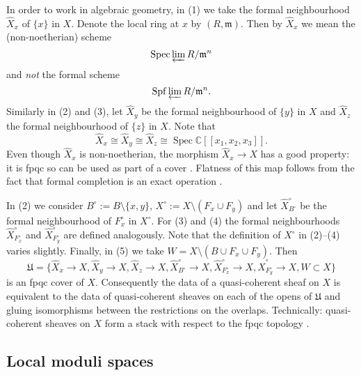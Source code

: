 \documentclass{amsart}
\theoremstyle{definition}
\newcommand{\CC} {\mathbb{C}}          %
\newcommand{\Spec}{\operatorname{Spec}}
\begin{document}
In order to work in algebraic geometry, in (1) we take the formal neighbourhood $\widehat{X}_x$ of $\{x\}$ in $X$. Denote the local ring at $x$ by $(R,\mathfrak{m})$. Then by $\widehat{X}_x$ we mean the (non-noetherian) scheme
$$
\Spec \varprojlim R / \mathfrak{m}^n 
$$
and \emph{not} the formal scheme $$\mathrm{Spf} \varprojlim R / \mathfrak{m}^n.$$ Similarly in (2) and (3), let $\widehat{X}_y$ be the formal neighbourhood of $\{y\}$ in $X$ and $\widehat{X}_z$ the formal neighbourhood of $\{z\}$ in $X$. Note that 
$$
\widehat{X}_x \cong \widehat{X}_y \cong \widehat{X}_z \cong\Spec \CC[\![x_1,x_2,x_3]\!].
$$
Even though $\widehat{X}_x$ is non-noetherian, the morphism $\widehat{X}_x \rightarrow X$ has a good property: it is fpqc so can be used as part of a cover \cite[Sect.~2.3.2]{Vis}. Flatness of this map follows from the fact that formal completion is an exact operation \cite[Prop.~10.14]{AM}. 

In (2) we consider $B^\circ := B \setminus \{x,y\}$, $X^\circ := X \setminus (F_x  \cup F_y)$ and let $\widehat{X}^{\circ}_{B^\circ}$ be the formal neighbourhood of $F_{x}^{\circ}$ in $X^\circ$. For (3) and (4) the formal neighbourhoods $\widehat{X}^{\circ}_{F_{x}^{\circ}}$ and $\widehat{X}^{\circ}_{F_{y}^{\circ}}$ are defined analogously. Note that the definition of $X^\circ$ in (2)--(4) varies slightly. Finally, in (5) we take $W = X \setminus (B \cup F_x \cup F_y)$. Then
$$
\mathfrak{U} = \{\widehat{X}_x \rightarrow X, \widehat{X}_y \rightarrow X, \widehat{X}_z \rightarrow X, \widehat{X}^{\circ}_{B^\circ} \rightarrow X, \widehat{X}^{\circ}_{F_{x}^{\circ}} \rightarrow X, \widehat{X}^{\circ}_{F_{y}^{\circ}} \rightarrow X, W \subset X\}
$$
is an fpqc cover of $X$. Consequently the data of a quasi-coherent sheaf on $X$ is equivalent to the data of quasi-coherent sheaves on each of the opens of $\mathfrak{U}$ and gluing isomorphisms between the restrictions on the overlaps. Technically: quasi-coherent sheaves on $X$ form a stack with respect to the fpqc topology \cite[Thm.~4.23]{Vis}.


\subsection{Local moduli spaces} \label{localmod}
\end{document}
